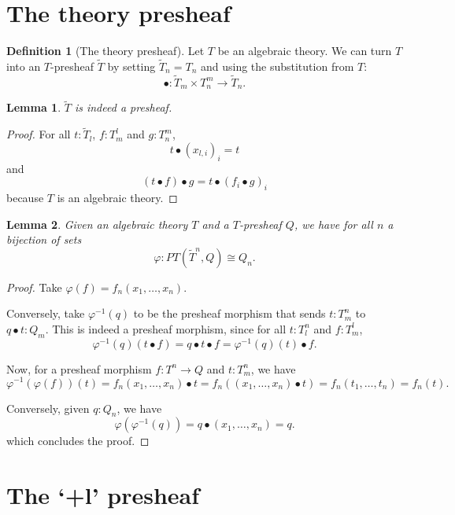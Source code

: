 \documentclass[a4paper]{amsbook}
\newtheorem{lemma}{Lemma}
\theoremstyle{definition}
\newtheorem{definition}{Definition}
\theoremstyle{remark}
\begin{document}
  \section{The theory presheaf}

  \begin{definition}[The theory presheaf]
    Let $ T $ be an algebraic theory. We can turn $ T $ into an $ T $-presheaf $ \tilde T $ by setting $ \tilde T_n = T_n $ and using the substitution from $ T $:
    \[ \bullet: \tilde T_m \times T_n^m \to \tilde T_n. \]
  \end{definition}

  \begin{lemma}
    $ \tilde T $ is indeed a presheaf.
  \end{lemma}
  \begin{proof}
    For all $ t: \tilde T_l $, $ f: T_m^l $ and $ g: T_n^m $,
    \[ t \bullet (x_{l, i})_i = t \]
    and
    \[ (t \bullet f) \bullet g = t \bullet (f_i \bullet g)_i \]
    because $ T $ is an algebraic theory.
  \end{proof}

  \begin{lemma}
    Given an algebraic theory $ T $ and a $ T $-presheaf $ Q $, we have for all $ n $ a bijection of sets
    \[ \varphi: PT(\tilde T^n, Q) \cong Q_n. \]
  \end{lemma}
  \begin{proof}
    Take $ \varphi(f) = f_n(x_1, \dots, x_n) $.

    Conversely, take $ \varphi^{-1}(q) $ to be the presheaf morphism that sends $ t: T^n_m $ to $ q \bullet t : Q_m $. This is indeed a presheaf morphism, since for all $ t: T^n_l $ and $ f: T^l_m $,
    \[ \varphi^{-1}(q)(t \bullet f) = q \bullet t \bullet f = \varphi^{-1}(q)(t) \bullet f. \]

    Now, for a presheaf morphism $ f: T^n \to Q $ and $ t: T^n_m $, we have
    \[ \varphi^{-1}(\varphi(f))(t) = f_n(x_1, \dots, x_n) \bullet t = f_n((x_1, \dots, x_n) \bullet t) = f_n(t_1, \dots, t_n) = f_n(t). \]

    Conversely, given $ q: Q_n $, we have
    \[ \varphi(\varphi^{-1}(q)) = q \bullet (x_1, \dots, x_n) = q. \]
    which concludes the proof.
  \end{proof}

  \section{The `+l' presheaf}
\end{document}
